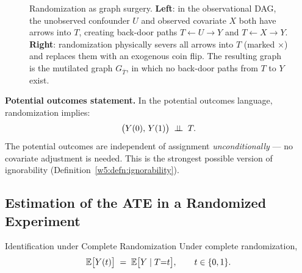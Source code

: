 \documentclass[master.tex]{subfiles}
\begin{document}
\begin{figure}[h]
\caption{Randomization as graph surgery.  \textbf{Left}: in the
observational DAG, the unobserved confounder $U$ and observed
covariate $X$ both have arrows into $T$, creating back-door paths
$T \leftarrow U \rightarrow Y$ and $T \leftarrow X \rightarrow Y$.
\textbf{Right}: randomization physically severs all arrows into $T$
(marked $\times$) and replaces them with an exogenous coin flip.  The
resulting graph is the mutilated graph $G_{\overline{T}}$, in which no
back-door paths from $T$ to $Y$ exist.}
\label{w5:fig:randomization-dag}
\end{figure}

\medskip\noindent\textbf{Potential outcomes statement.}  In the potential
outcomes language, randomization implies:
\[
  \bigl(Y(0),\, Y(1)\bigr) \;\perp\!\!\!\perp\; T.
\]
The potential outcomes are independent of assignment
\emph{unconditionally} --- no covariate adjustment is needed.  This is
the strongest possible version of ignorability
(Definition~\ref{w5:defn:ignorability}).

\subsection{Estimation of the ATE in a Randomized Experiment}

\begin{lemma}{Identification under Complete Randomization}
\label{w5:prop:rct-id}
Under complete randomization,
\begin{equation}
  \mathbb{E}\bigl[Y(t)\bigr] \;=\; \mathbb{E}\bigl[Y \mid T{=}t\bigr],
  \qquad t \in \{0,1\}.
  \label{w5:eq:rct-id}
\end{equation}
\end{lemma}
\end{document}
